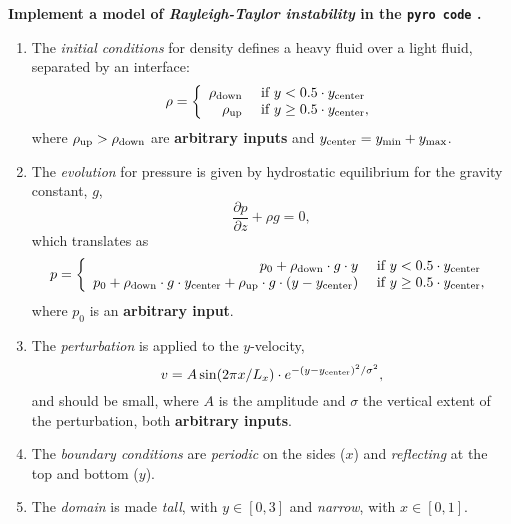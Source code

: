 \documentclass[10pt]{article}
\author{\color{purple}{\bf MIA STEIN}}
\title{\color{red}{\bf PHYS 688: Numerical Methods for AstroPhysics \\Homework \#6: 2D Rayleigh-Taylor Instability} }
\begin{document}
\maketitle




{\color{MidnightBlue}
{\bf Implement a model of {\it Rayleigh-Taylor instability} in the  \texttt{pyro code} \cite{pyro}.}}

\quad


\begin{enumerate}
\item The {\it initial conditions} for density defines a heavy fluid over a light fluid, separated by an interface:
$$
\rho = \left\{ \begin{array}{rl}
\rho_{\rm down}  &\mbox{ if } y < 0.5 \cdot y_{\rm center}  \\
 \rho_{\rm up}  &\mbox{ if } y \geq 0.5 \cdot y_{\rm center}  ,
       \end{array} \right.
$$
where $\rho_{\rm up}>\rho_{\rm down}$ are {\bf arbitrary inputs} and $y_{\rm center} = y_{\rm min} + y_{\rm max}$.

\quad


\item The {\it evolution} for pressure is given by hydrostatic equilibrium for the gravity constant, $g$,
$$ \frac{\partial p}{\partial z} + \rho g = 0,$$
which translates as
$$
p = \left\{ \begin{array}{rl}
 p_0 + \rho_{\rm down }\cdot g \cdot y  &\mbox{ if } y< 0.5 \cdot y_{\rm center}  \\
 p_0 + \rho_{\rm down}  \cdot g  \cdot y_{\rm center} + \rho_{\rm up} \cdot g \cdot (y - y_{\rm center})  &\mbox{ if } y \geq 0.5 \cdot y_{\rm center} ,
       \end{array} \right.
$$
where $p_0$ is an {\bf arbitrary input}.

\quad

\item The {\it perturbation} is applied to the $y$-velocity,
$$ v = A \sin(2 \pi x/ L_x) \cdot e^{-(y-y_{\rm center})^2/\sigma^2},$$
and should be small, where $A$ is the amplitude and $\sigma$ the vertical extent of the perturbation, both {\bf arbitrary inputs}.

\quad

\item The {\it boundary conditions} are {\it periodic} on the sides ($x$) and {\it reflecting} at the top and 
bottom ($y$).

\quad

\item The {\it domain} is made {\it tall}, with $y \in [0,3]$ and {\it narrow}, with $x \in [0,1]$.

\end{enumerate}
\end{document}
